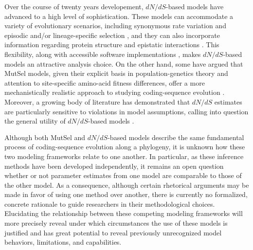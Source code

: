 \documentclass[11pt]{article}
\begin{document}
Over the course of twenty years developement, $dN/dS$-based models have advanced to a high level of sophistication. These models can accommodate a variety of evolutionary scenarios, including synonymous rate variation \citep{MuseGaut1994,KosakovskyPondMuse2005} and episodic \citep{KosakovskyPondetal2011,MEME} and/or lineage-specific selection \citep{YangNielsen2002,Zhangetal2005,KosakovskyPondFrost2005a}, and they can also incorporate information regarding protein structure and epistatic interactions \citep{Robinsonetal2003,Thorneetal2007,Rodrigueetal2009,Scherreretal2012,MeyerWilke2013}. This flexibility, along with accessible software implementations \citep{KosakovskyPondetal2005,Yang2007,Delport2010}, makes $dN/dS$-based models an attractive analysis choice. On the other hand, some have argued that MutSel models, given their explicit basis in population-genetics theory and attention to site-specific amino-acid fitness differences, offer a more mechanistically realistic approach to studying coding-sequence evolution \citep{HalpernBruno1998,Rodrigueetal2010,Tamurietal2012,Thorne2012}. Moreover, a growing body of literature has demonstrated that $dN/dS$ estimates are particularly sensitive to violations in model assumptions, calling into question the general utility of $dN/dS$-based models \citep{Rochaetal2006,KryazhimskiyPlotkin2008,Mugaletal2014}.
		
Although both MutSel and $dN/dS$-based models describe the same fundamental process of coding-sequence evolution along a phylogeny, it is unknown how these two modeling frameworks relate to one another. In particular, as these inference methods have been developed independently, it remains an open question whether or not parameter estimates from one model are comparable to those of the other model. As a consequence, although certain rhetorical arguments may be made in favor of using one method over another, there is currently no formalized, concrete rationale to guide researchers in their methodological choices. Elucidating the relationship between these competing modeling frameworks will more precisely reveal under which circumstances the use of these models is justified and has great potential to reveal previously unrecognized model behaviors, limitations, and capabilities.
		
\end{document}
